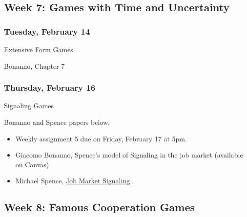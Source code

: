 \documentclass[
]{article}
\providecommand{\tightlist}{%
  \setlength{\itemsep}{0pt}\setlength{\parskip}{0pt}}
\begin{document}
\hypertarget{week-7-games-with-time-and-uncertainty}{%
\subsection{Week 7: Games with Time and
Uncertainty}\label{week-7-games-with-time-and-uncertainty}}

\begin{multicols}{2}

\hypertarget{tuesday-february-14}{%
\subsubsection{Tuesday, February 14}\label{tuesday-february-14}}

\begin{description}
\tightlist
\item[Topic]
Extensive Form Games
\item[Reading]
Bonanno, Chapter 7
\end{description}

\hypertarget{thursday-february-16}{%
\subsubsection{Thursday, February 16}\label{thursday-february-16}}

\begin{description}
\tightlist
\item[Topic]
Signaling Games
\item[Reading]
Bonanno and Spence papers below.
\end{description}

\end{multicols}

\begin{itemize}
\tightlist
\item
  Weekly assignment 5 due on Friday, February 17 at 5pm.
\item
  Giacomo Bonanno, Spence's model of Signaling in the job market
  (available on Canvas)
\item
  Michael Spence, \href{https://www.jstor.org/stable/1882010?seq=1}{Job
  Market Signaling}
\end{itemize}

\newpage

\hypertarget{week-8-famous-cooperation-games}{%
\subsection{Week 8: Famous Cooperation
Games}\label{week-8-famous-cooperation-games}}
\end{document}
